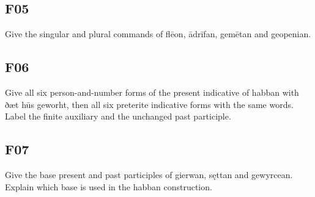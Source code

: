 \subsection*{F05}

\par\begin{minipage}{\linewidth}\raggedright
Give the singular and plural commands of flēon, ādrīfan, gemētan and geopenian.

\end{minipage}\par\addvspace{4pt}

\subsection*{F06}

\par\begin{minipage}{\linewidth}\raggedright
Give all six person-and-number forms of the present indicative of habban with ðæt hūs geworht, then all six preterite indicative forms with the same words. Label the finite auxiliary and the unchanged past participle.

\end{minipage}\par\addvspace{4pt}

\subsection*{F07}

\par\begin{minipage}{\linewidth}\raggedright
Give the base present and past participles of gierwan, sęttan and gewyrcean. Explain which base is used in the habban construction.

\end{minipage}\par\addvspace{4pt}

